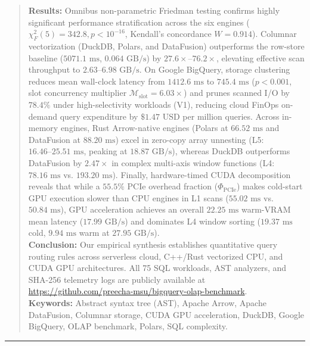 \documentclass[10pt,a4paper]{article}
\begin{document}
\begin{quote}
\textbf{Results:} Omnibus non-parametric Friedman testing confirms highly significant performance stratification across the six engines ($\chi^2_F(5) = 342.8, p < 10^{-16}$, Kendall's concordance $W = 0.914$). Columnar vectorization (DuckDB, Polars, and DataFusion) outperforms the row-store baseline ($5071.1\text{ ms}$, $0.064\text{ GB/s}$) by $27.6\times\text{--}76.2\times$, elevating effective scan throughput to $2.63\text{--}6.98\text{ GB/s}$. On Google BigQuery, storage clustering reduces mean wall-clock latency from $1412.6\text{ ms}$ to $745.4\text{ ms}$ ($p < 0.001$, slot concurrency multiplier $\mathcal{M}_{\text{slot}}=6.03\times$) and prunes scanned I/O by $78.4\%$ under high-selectivity workloads (V1), reducing cloud FinOps on-demand query expenditure by $\$1.47\text{ USD}$ per million queries. Across in-memory engines, Rust Arrow-native engines (Polars at $66.52\text{ ms}$ and DataFusion at $88.20\text{ ms}$) excel in zero-copy array unnesting (L5: $16.46\text{--}25.51\text{ ms}$, peaking at $18.87\text{ GB/s}$), whereas DuckDB outperforms DataFusion by $2.47\times$ in complex multi-axis window functions (L4: $78.16\text{ ms}$ vs. $193.20\text{ ms}$). Finally, hardware-timed CUDA decomposition reveals that while a $55.5\%$ PCIe overhead fraction ($\Phi_{\text{PCIe}}$) makes cold-start GPU execution slower than CPU engines in L1 scans ($55.02\text{ ms}$ vs. $50.84\text{ ms}$), GPU acceleration achieves an overall $22.25\text{ ms}$ warm-VRAM mean latency ($17.99\text{ GB/s}$) and dominates L4 window sorting ($19.37\text{ ms}$ cold, $9.94\text{ ms}$ warm at $27.95\text{ GB/s}$).\\[0.25em]
\textbf{Conclusion:} Our empirical synthesis establishes quantitative query routing rules across serverless cloud, C++/Rust vectorized CPU, and CUDA GPU architectures. All 75 SQL workloads, AST analyzers, and SHA-256 telemetry logs are publicly available at \url{https://github.com/preecha-msu/bigquery-olap-benchmark}.\\[0.45em]
\textbf{\color{springerblue}Keywords:} Abstract syntax tree (AST), Apache Arrow, Apache DataFusion, Columnar storage, CUDA GPU acceleration, DuckDB, Google BigQuery, OLAP benchmark, Polars, SQL complexity.
\end{quote}
\noindent\rule{\textwidth}{0.8pt}

\end{document}
